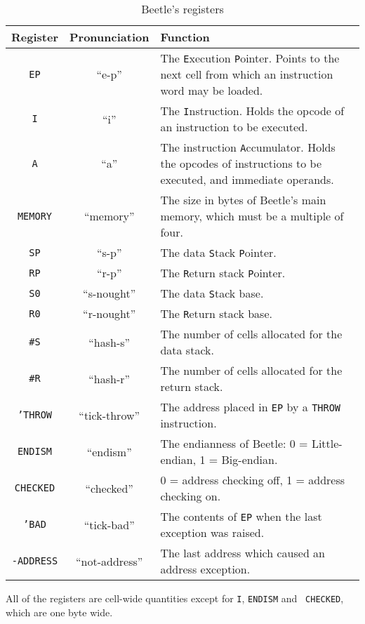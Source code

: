\documentclass[english]{article}
\newlength{\opcode}\opcode=0.5in
\begin{document}
\begin{table}[htbp]
\begin{center}
\begin{tabular}{ccp{3.75in}} \toprule
\bf Register & \bf Pronunciation & \bf Function \\
    \midrule
{\tt EP} & ``e-p'' & The {\tt E}xecution {\tt P}ointer. Points to the next
    cell from which an instruction word may be loaded. \\
{\tt I} & ``i'' & The {\tt I}nstruction. Holds the opcode of an instruction
    to be executed. \\
{\tt A} & ``a'' & The instruction {\tt A}ccumulator. Holds the opcodes of
    instructions to be executed, and immediate operands. \\
{\tt MEMORY} & ``memory'' & The size in bytes of Beetle's main memory,
    which must be a multiple of four. \\
{\tt SP} & ``s-p'' & The data {\tt S}tack {\tt P}ointer. \\
{\tt RP} & ``r-p'' & The {\tt R}eturn stack {\tt P}ointer. \\
{\tt S0} & ``s-nought'' & The data {\tt S}tack base. \\
{\tt R0} & ``r-nought'' & The {\tt R}eturn stack base. \\
{\tt \#S} & ``hash-s'' & The number of cells allocated for the data stack. \\
{\tt \#R} & ``hash-r'' & The number of cells allocated for the return stack. \\
{\tt 'THROW} & ``tick-throw'' & The address placed in {\tt EP} by a {\tt THROW}
    instruction. \\
{\tt ENDISM} & ``endism'' & The endianness of Beetle: 0 = Little-endian,
    1 = Big-endian. \\
{\tt CHECKED} & ``checked'' & 0 = address checking off, 1 = address checking
    on. \\
{\tt 'BAD} & ``tick-bad'' & The contents of {\tt EP} when the last exception
    was raised. \\
{\tt -ADDRESS} & ``not-address'' & The last address which caused an address
    exception. \\ \bottomrule
\end{tabular}
\caption{\label{regtable}Beetle's registers}
\end{center}
\end{table}

All of the registers are cell-wide quantities except for {\tt I}, {\tt ENDISM} and {\tt
CHECKED}, which are one byte wide.
\end{document}

